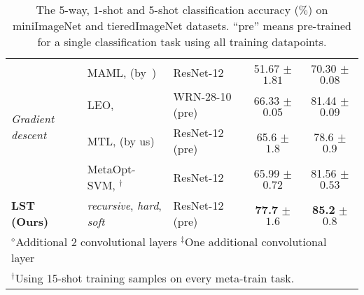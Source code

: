 \documentclass{article}
\begin{document}
\begin{table*}
\begin{tabular}{l l lcc}
\multirow{4}{*}{\emph{Gradient descent}}
    & MAML, \cite{FinnAL17} (by~\cite{LiuICLR2019transductive}) & ResNet-12 & 51.67 $\pm$ $1.81$ & 70.30 $\pm$ $0.08$ \\
    & LEO, \cite{RusuICLR2019} & WRN-28-10 (pre) & 66.33 $\pm$ $0.05$ & 81.44 $\pm$ $0.09$ \\
    & MTL, \cite{SunCVPR2019} (by us) & ResNet-12 (pre) & 65.6 $\pm$ $1.8$  & 78.6 $\pm$ $0.9$ \\
    & MetaOpt-SVM, \cite{LeeCVPR19svm}${}^{\dag}$ & ResNet-12 & 65.99 $\pm$ $0.72$  & 81.56 $\pm$ $0.53$ \\
\midrule
\textbf{LST (Ours)} & \emph{recursive}, \emph{hard}, \emph{soft}  & ResNet-12 (pre) & \textbf{77.7} $\pm$ $1.6$ & \textbf{85.2} $\pm$ $0.8$ \\
\bottomrule
    \multicolumn{5}{l}{${}^{\diamond}$Additional 2 convolutional layers { } ${}^{\ddag}$One additional convolutional layer} \\
    \multicolumn{5}{l}{${}^{\dag}$Using 15-shot training samples on every meta-train task.} \\
\end{tabular}
\vspace{-0.1cm}
  \caption{The $5$-way, $1$-shot and $5$-shot classification accuracy ($\%$) on miniImageNet and tieredImageNet datasets. ``pre'' means pre-trained for a single classification task using all training datapoints.}
    \label{table_mini}
    \vspace{-0.1cm}
\end{table*}
\end{document}
